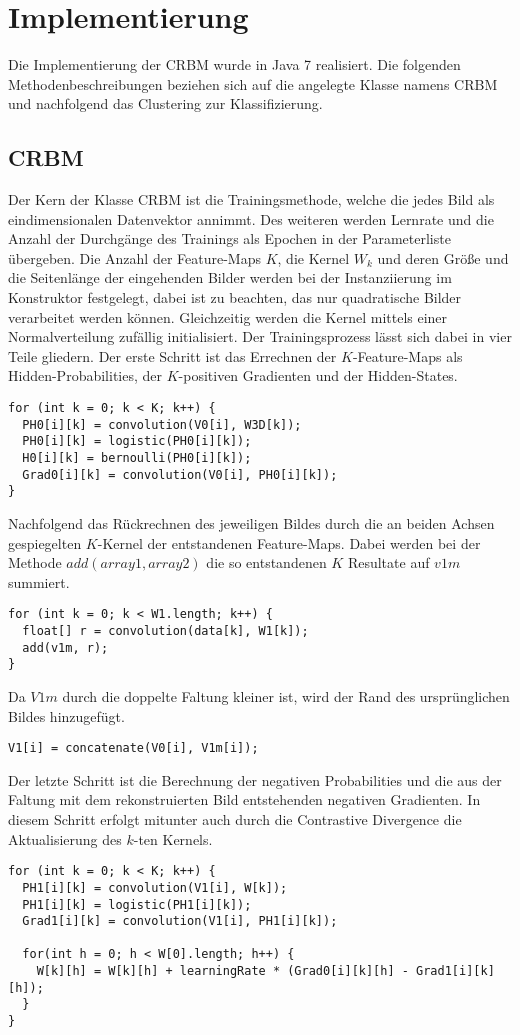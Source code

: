 \section{Implementierung}\label{implementation}
Die Implementierung der CRBM wurde in Java 7 realisiert.
Die folgenden Methodenbeschreibungen beziehen sich auf die angelegte Klasse namens CRBM und nachfolgend das Clustering zur Klassifizierung.
\subsection{CRBM}
Der Kern der Klasse CRBM ist die Trainingsmethode, welche die jedes Bild als eindimensionalen Datenvektor annimmt. Des weiteren werden Lernrate und die Anzahl der Durchgänge des Trainings als Epochen in der Parameterliste übergeben.
Die Anzahl der Feature-Maps $K$, die Kernel $W_k$ und deren Größe und die Seitenlänge der eingehenden Bilder werden bei der Instanziierung im Konstruktor festgelegt, dabei ist zu beachten, das nur quadratische Bilder verarbeitet werden können. Gleichzeitig werden die Kernel mittels einer Normalverteilung zufällig initialisiert.
Der Trainingsprozess lässt sich dabei in vier Teile gliedern. Der erste Schritt ist das Errechnen der $K$-Feature-Maps als Hidden-Probabilities, der $K$-positiven Gradienten und der Hidden-States.
\begin{lstlisting}
for (int k = 0; k < K; k++) {
  PH0[i][k] = convolution(V0[i], W3D[k]);
  PH0[i][k] = logistic(PH0[i][k]);
  H0[i][k] = bernoulli(PH0[i][k]);
  Grad0[i][k] = convolution(V0[i], PH0[i][k]);
}
\end{lstlisting}
Nachfolgend das Rückrechnen des jeweiligen Bildes durch die an beiden Achsen gespiegelten $K$-Kernel der entstandenen Feature-Maps. 
Dabei werden bei der Methode $add(array1, array2)$ die so entstandenen $K$ Resultate auf $v1m$ summiert.
\begin{lstlisting}
for (int k = 0; k < W1.length; k++) {
  float[] r = convolution(data[k], W1[k]);
  add(v1m, r);
}
\end{lstlisting}
Da $V1m$ durch die doppelte Faltung kleiner ist, wird der Rand des ursprünglichen Bildes hinzugefügt.
\begin{lstlisting}
V1[i] = concatenate(V0[i], V1m[i]);
\end{lstlisting}
Der letzte Schritt ist die Berechnung der negativen Probabilities und die aus der Faltung mit dem rekonstruierten Bild entstehenden negativen Gradienten. 
In diesem Schritt erfolgt mitunter auch durch die Contrastive Divergence die Aktualisierung des $k$-ten Kernels.
\begin{lstlisting}
for (int k = 0; k < K; k++) {
  PH1[i][k] = convolution(V1[i], W[k]);
  PH1[i][k] = logistic(PH1[i][k]);
  Grad1[i][k] = convolution(V1[i], PH1[i][k]);

  for(int h = 0; h < W[0].length; h++) {
    W[k][h] = W[k][h] + learningRate * (Grad0[i][k][h] - Grad1[i][k][h]);
  }
}
\end{lstlisting}

